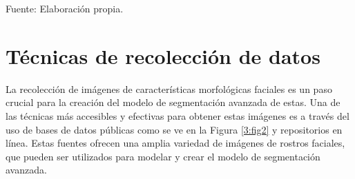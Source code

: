 


\begin{flushleft}
	\small Fuente: Elaboración propia.
\end{flushleft}


   

\section{Técnicas de recolección de datos}
La recolección de imágenes de características morfológicas faciales es un paso crucial para la creación del modelo de segmentación avanzada de estas. Una de las técnicas más accesibles y efectivas para obtener estas imágenes es a través del uso de bases de datos públicas como se ve en la Figura \ref{3:fig2} y repositorios en línea. Estas fuentes ofrecen una amplia variedad de imágenes de rostros faciales, que pueden ser utilizados para modelar y crear el modelo de segmentación avanzada.

